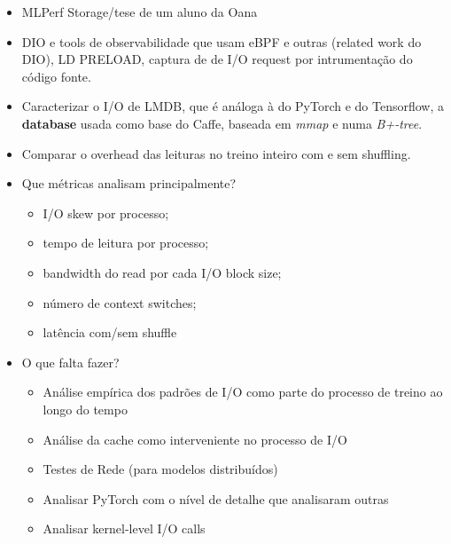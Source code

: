 \documentclass[conference]{IEEEtran}
\begin{document}
\begin{itemize}
    \item MLPerf Storage/tese de um aluno da Oana
    \item DIO e tools de observabilidade que usam eBPF e outras (related work do DIO), LD PRELOAD, captura de de I/O request por intrumentação do código fonte.
    \item Caracterizar o I/O de LMDB, que é análoga à do PyTorch e do Tensorflow, a \textbf{database} usada como base do Caffe, baseada em \textit{mmap} e numa \textit{B+-tree}. \cite{LMDB}
    \item Comparar o overhead das leituras no treino inteiro com e sem shuffling. \cite{initial}
    \item Que métricas analisam principalmente?
    \begin{itemize}
        \item I/O skew por processo;
        \item tempo de leitura por processo;
        \item bandwidth do read por cada I/O block size;
        \item número de context switches;
        \item latência com/sem shuffle
    \end{itemize} 
    \item O que falta fazer?
    \begin{itemize}
        \item Análise empírica dos padrões de I/O como parte do processo de treino ao longo do tempo
        \item Análise da cache como interveniente no processo de I/O
        \item Testes de Rede (para modelos distribuídos)
        \item Analisar PyTorch com o nível de detalhe que analisaram outras
        \item Analisar kernel-level I/O calls 
    \end{itemize}
\end{itemize}
\end{document}
